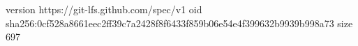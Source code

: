 version https://git-lfs.github.com/spec/v1
oid sha256:0cf528a8661eec2ff39c7a2428f8f6433f859b06e54e4f399632b9939b998a73
size 697
